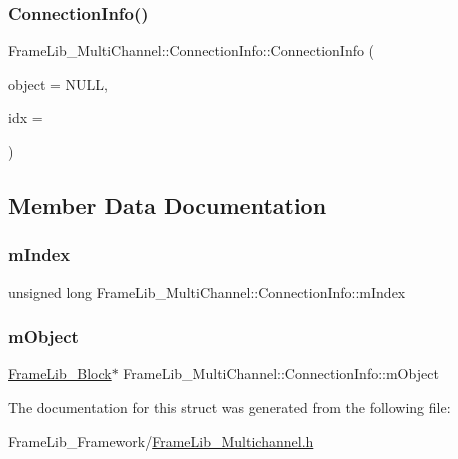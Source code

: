 \subsubsection{\texorpdfstring{Connection\+Info()}{ConnectionInfo()}}
{\footnotesize\ttfamily Frame\+Lib\+\_\+\+Multi\+Channel\+::\+Connection\+Info\+::\+Connection\+Info (\begin{DoxyParamCaption}\item[{\hyperlink{class_frame_lib___block}{Frame\+Lib\+\_\+\+Block} $\ast$}]{object = {\ttfamily NULL},  }\item[{unsigned long}]{idx = {} }\end{DoxyParamCaption})\hspace{0.3cm}{\ttfamily [inline]}}



\subsection{Member Data Documentation}
\mbox{\label{struct_frame_lib___multi_channel_1_1_connection_info_a1c5e57c99d6ce5ce6b5751fa76b5d787}} 
\subsubsection{\texorpdfstring{m\+Index}{mIndex}}
{\footnotesize\ttfamily unsigned long Frame\+Lib\+\_\+\+Multi\+Channel\+::\+Connection\+Info\+::m\+Index}

\mbox{\label{struct_frame_lib___multi_channel_1_1_connection_info_a69b915998854a851374567e7fed7a09d}} 
\subsubsection{\texorpdfstring{m\+Object}{mObject}}
{\footnotesize\ttfamily \hyperlink{class_frame_lib___block}{Frame\+Lib\+\_\+\+Block}$\ast$ Frame\+Lib\+\_\+\+Multi\+Channel\+::\+Connection\+Info\+::m\+Object}



The documentation for this struct was generated from the following file\+:\begin{DoxyCompactItemize}
\item 
Frame\+Lib\+\_\+\+Framework/\hyperlink{_frame_lib___multichannel_8h}{Frame\+Lib\+\_\+\+Multichannel.\+h}\end{DoxyCompactItemize}
